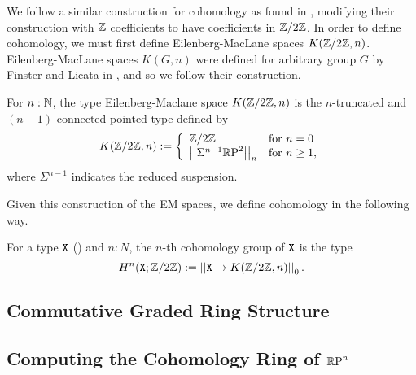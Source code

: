 \documentclass{amsart}
\begin{document}
We follow a similar construction for cohomology as found in \cite{brunerie:thesis}, modifying their construction with $\mathbb{Z}$ coefficients to have coefficients in $\mathbb{Z}/2\mathbb{Z}$. In order to define cohomology, we must first define Eilenberg-MacLane spaces $K(\mathbb{Z}/2\mathbb{Z},n)$. Eilenberg-MacLane spaces $K(G,n)$ were defined for arbitrary group $G$ by Finster and Licata in \cite{fl:em}, and so we follow their construction. 

\begin{definition}
	For $n:\mathbb{N}$, the type Eilenberg-Maclane space $K(\mathbb{Z}/2\mathbb{Z},n)$ is the $n$-truncated and $(n-1)$-connected pointed type defined by
	\[ K(\mathbb{Z}/2\mathbb{Z},n):=\left\{ \begin{array}{ll} \mathbb{Z}/2\mathbb{Z} & \text{for }n=0\\
	\left| \left| \Sigma^{n-1}\mathbb{R}\textrm{P}^2\right| \right|_n & \text{for } n\ge 1, 
	\end{array}\right.\]
	where $\Sigma^{n-1}$ indicates the reduced suspension. 
\end{definition}


Given this construction of the EM spaces, we define cohomology in the following way. 

\begin{definition}
	For a type $\mathtt{X}$ () and $n:N$, the $n$-th cohomology group of $\mathtt{X}$ is the type
	\[H^n(\mathtt{X};\mathbb{Z}/2\mathbb{Z}):= \left| \left| \mathtt{X}\rightarrow K(\mathbb{Z}/2\mathbb{Z},n)\right| \right|_0.\] 
\end{definition}


\subsection{Commutative Graded Ring Structure}

\subsection{Computing the Cohomology Ring of $\mathbb{R}\textrm{P}^n$}




\end{document}
